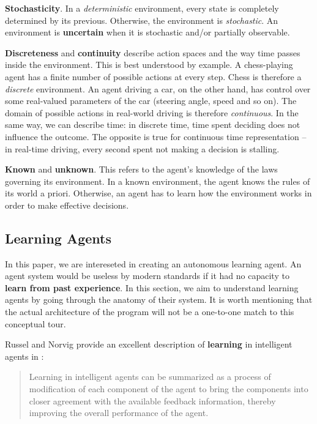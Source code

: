 \textbf{Stochasticity}.
In a \emph{deterministic} environment, every state is completely determined by its previous. Otherwise, the environment is \emph{stochastic}. An environment is \textbf{uncertain} when it is stochastic and/or partially observable.

\textbf{Discreteness} and \textbf{continuity} describe action spaces and the way time passes inside the environment.
This is best understood by example.
A chess-playing agent has a finite number of possible actions at every step.
Chess is therefore a \emph{discrete} environment.
An agent driving a car, on the other hand, has control over some real-valued parameters of the car (steering angle, speed and so on).
The domain of possible actions in real-world driving is therefore \emph{continuous}.
In the same way, we can describe time: in discrete time, time spent deciding does not influence the outcome. The opposite is true for continuous time representation -- in real-time driving, every second spent not making a decision is stalling.

\textbf{Known} and \textbf{unknown}.
This refers to the agent's knowledge of the laws governing its environment. In a known environment, the agent knows the rules of its world a priori. Otherwise, an agent has to learn how the environment works in order to make effective decisions.


\subsection{Learning Agents} \label{learning-agents}
In this paper, we are intereseted in creating an autonomous learning agent.
An agent system would be useless by modern standards if it had no capacity to \textbf{learn from past experience}.
In this section, we aim to understand learning agents by going through the anatomy of their system.
It is worth mentioning that the actual architecture of the program will not be a one-to-one match to this conceptual tour.

Russel and Norvig provide an excellent description of \textbf{learning} in intelligent agents in \cite{aima}:
\begin{quote}
    Learning in intelligent agents can be summarized as a process of modification of each component of the agent to bring the components into closer agreement with the available feedback information, thereby improving the overall performance of the agent.
\end{quote}

